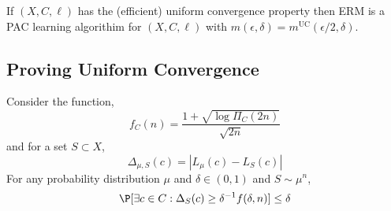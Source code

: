 \documentclass[12pt]{article}
\begin{document}
\begin{cor}
If $(X, C, \ell)$ has the (efficient) uniform convergence property then ERM is a PAC learning algorithim for $(X, C, \ell)$ with $m(\epsilon, \delta) = m^{\text{UC}}(\epsilon/2, \delta)$. 
\end{cor}

\subsection{Proving Uniform Convergence}


\begin{prop}
Consider the function,
\[ f_C(n) = \frac{1 + \sqrt{\log{\Pi_C(2n)}}}{\sqrt{2n}} \]
and for a set $S \subset X$, 
\[ \Delta_{\mu,S}(c) = |L_\mu(c) - L_S(c)| \]
For any probability distribution $\mu$ and $\delta \in (0,1)$ and $S \sim \mu^n$,
\[ \P[\exists c \in C : \Delta_S(c) \ge \delta^{-1} f(\delta, n)] \le \delta \]
\end{prop}
\end{document}
